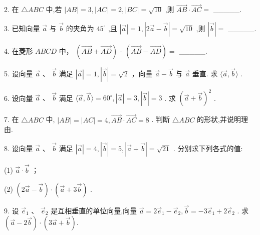 \documentclass[10pt]{article}
\begin{document}
2. 在 \(\bigtriangleup {ABC}\) 中,若 \(\left| {AB}\right|  = 3,\left| {AC}\right|  = 2,\left| {BC}\right|  = \sqrt{10}\) ,则 \(\overrightarrow{AB} \cdot  \overrightarrow{AC} =\) \_\_\_\_\_.

3. 已知向量 \(\overrightarrow{a}\) 与 \(\overrightarrow{b}\) 的夹角为 \({45}^{ \circ  }\) ,且 \(\left| \overrightarrow{a}\right|  = 1,\left| {2\overrightarrow{a} - \overrightarrow{b}}\right|  = \sqrt{10}\) ,则 \(\left| \overrightarrow{b}\right|  =\) \_\_\_\_\_.

4. 在菱形 \({ABCD}\) 中， \(\left( {\overrightarrow{AB} + \overrightarrow{AD}}\right)\) - \(\left( {\overrightarrow{AB} - \overrightarrow{AD}}\right)  =\) \_\_\_\_\_.

5. 设向量 \(\overrightarrow{a}\text{ 、 }\overrightarrow{b}\) 满足 \(\left| \overrightarrow{a}\right|  = 1,\left| \overrightarrow{b}\right|  = \sqrt{2}\) ，向量 \(\overrightarrow{a} - \overrightarrow{b}\) 与 \(\overrightarrow{a}\) 垂直. 求 \(\langle \overrightarrow{a},\overrightarrow{b}\rangle\) .

6. 设向量 \(\overrightarrow{a}\text{ 、 }\overrightarrow{b}\) 满足 \(\langle \overrightarrow{a},\overrightarrow{b}\rangle  = {60}^{ \circ  },\left| \overrightarrow{a}\right|  = 3,\left| \overrightarrow{b}\right|  = 3\) . 求 \({\left( \overrightarrow{a} + \overrightarrow{b}\right) }^{2}\) .

7. 在 \(\bigtriangleup {ABC}\) 中, \(\left| {AB}\right|  = \left| {AC}\right|  = 4,\overrightarrow{AB} \cdot  \overrightarrow{AC} = 8\) . 判断 \(\bigtriangleup {ABC}\) 的形状,并说明理由.

8. 设向量 \(\overrightarrow{a}\text{ 、 }\overrightarrow{b}\) 满足 \(\left| \overrightarrow{a}\right|  = 4,\left| \overrightarrow{b}\right|  = 5,\left| {\overrightarrow{a} + \overrightarrow{b}}\right|  = \sqrt{21}\) . 分别求下列各式的值:

(1) \(\overrightarrow{a} \cdot  \overrightarrow{b}\) ；

(2) \(\left( {2\overrightarrow{a} - \overrightarrow{b}}\right)  \cdot  \left( {\overrightarrow{a} + 3\overrightarrow{b}}\right)\) .

9. 设 \({\overrightarrow{e}}_{1}\text{ 、 }{\overrightarrow{e}}_{2}\) 是互相垂直的单位向量,向量 \(\overrightarrow{a} = 2{\overrightarrow{e}}_{1} - {\overrightarrow{e}}_{2},\overrightarrow{b} =  - 3{\overrightarrow{e}}_{1} + 2{\overrightarrow{e}}_{2}\) . 求 \(\left( {\overrightarrow{a} - 2\overrightarrow{b}}\right)  \cdot  \left( {3\overrightarrow{a} + \overrightarrow{b}}\right) .\)
\end{document}
